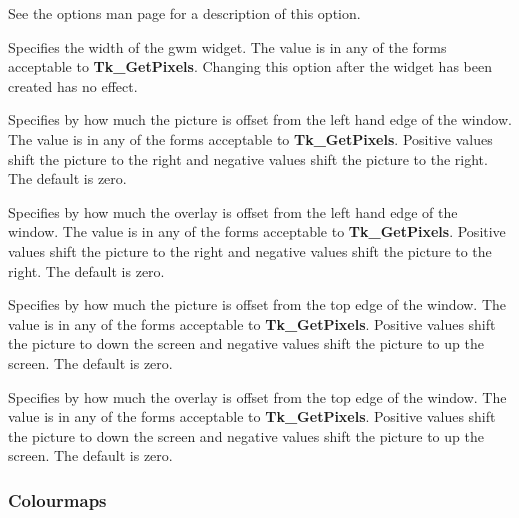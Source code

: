\begin{rquote}
See the options man page for a description of this option.
\end{rquote}

\begin{rquote}
Specifies the width of the gwm widget. The value is in any of the forms
acceptable to {\bf Tk\_GetPixels}. Changing this option after the widget 
has been created has no effect.
\end{rquote}

\begin{rquote}
Specifies by how much the picture is offset from the left hand edge of the
window. The value is in any of the forms acceptable to {\bf Tk\_GetPixels}. 
Positive values shift the picture to the right and negative values shift the
picture to the right. The default is zero.
\end{rquote}

\begin{rquote}
Specifies by how much the overlay is offset from the left hand edge of the
window. The value is in any of the forms acceptable to {\bf Tk\_GetPixels}. 
Positive values shift the picture to the right and negative values shift the
picture to the right. The default is zero.
\end{rquote}

\begin{rquote}
Specifies by how much the picture is offset from the top edge of the
window. The value is in any of the forms acceptable to {\bf Tk\_GetPixels}. 
Positive values shift the picture to down the screen and negative values 
shift the picture to up the screen. The default is zero.
\end{rquote}

\begin{rquote}
Specifies by how much the overlay is offset from the top edge of the
window. The value is in any of the forms acceptable to {\bf Tk\_GetPixels}. 
Positive values shift the picture to down the screen and negative values 
shift the picture to up the screen. The default is zero.
\end{rquote}

\subsubsection{Colourmaps}

